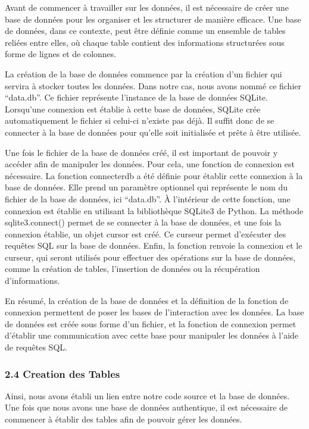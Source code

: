 \documentclass[
]{article}
\begin{document}
Avant de commencer à travailler sur les données, il est nécessaire de
créer une base de données pour les organiser et les structurer de
manière efficace. Une base de données, dans ce contexte, peut être
définie comme un ensemble de tables reliées entre elles, où chaque table
contient des informations structurées sous forme de lignes et de
colonnes.

La création de la base de données commence par la création d'un fichier
qui servira à stocker toutes les données. Dans notre cas, nous avons
nommé ce fichier ``data.db''. Ce fichier représente l'instance de la
base de données SQLite. Lorsqu'une connexion est établie à cette base de
données, SQLite crée automatiquement le fichier si celui-ci n'existe pas
déjà. Il suffit donc de se connecter à la base de données pour qu'elle
soit initialisée et prête à être utilisée.

Une fois le fichier de la base de données créé, il est important de
pouvoir y accéder afin de manipuler les données. Pour cela, une fonction
de connexion est nécessaire. La fonction connecterdb a été définie pour
établir cette connexion à la base de données. Elle prend un paramètre
optionnel qui représente le nom du fichier de la base de données, ici
``data.db''. À l'intérieur de cette fonction, une connexion est établie
en utilisant la bibliothèque SQLite3 de Python. La méthode
sqlite3.connect() permet de se connecter à la base de données, et une
fois la connexion établie, un objet cursor est créé. Ce curseur permet
d'exécuter des requêtes SQL sur la base de données. Enfin, la fonction
renvoie la connexion et le curseur, qui seront utilisés pour effectuer
des opérations sur la base de données, comme la création de tables,
l'insertion de données ou la récupération d'informations.

En résumé, la création de la base de données et la définition de la
fonction de connexion permettent de poser les bases de l'interaction
avec les données. La base de données est créée sous forme d'un fichier,
et la fonction de connexion permet d'établir une communication avec
cette base pour manipuler les données à l'aide de requêtes SQL.

\subsubsection{2.4 Creation des Tables}\label{creation-des-tables}

Ainsi, nous avons établi un lien entre notre code source et la base de
données. Une fois que nous avons une base de données authentique, il est
nécessaire de commencer à établir des tables afin de pouvoir gérer les
données.
\end{document}
